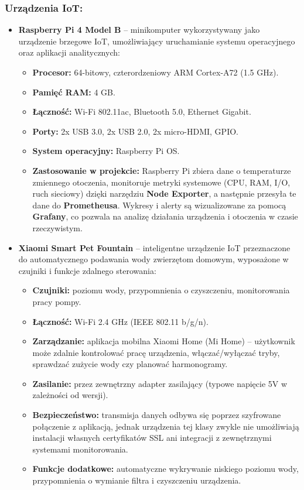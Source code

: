 \subsubsection{Urządzenia IoT:}
\begin{itemize}
\item \textbf{Raspberry Pi 4 Model B} – minikomputer wykorzystywany jako urządzenie brzegowe IoT, umożliwiający uruchamianie systemu operacyjnego oraz aplikacji analitycznych:
\begin{itemize}
\item \textbf{Procesor:} 64-bitowy, czterordzeniowy ARM Cortex-A72 (1.5 GHz).
\item \textbf{Pamięć RAM:} 4 GB.
\item \textbf{Łączność:} Wi-Fi 802.11ac, Bluetooth 5.0, Ethernet Gigabit.
\item \textbf{Porty:} 2x USB 3.0, 2x USB 2.0, 2x micro-HDMI, GPIO.
\item \textbf{System operacyjny:} Raspberry Pi OS.
\item \textbf{Zastosowanie w projekcie:} Raspberry Pi zbiera dane o temperaturze zmiennego otoczenia, monitoruje metryki systemowe (CPU, RAM, I/O, ruch sieciowy) dzięki narzędziu \textbf{Node Exporter}, a następnie przesyła te dane do \textbf{Prometheusa}. Wykresy i alerty są wizualizowane za pomocą \textbf{Grafany}, co pozwala na analizę działania urządzenia i otoczenia w czasie rzeczywistym.
\end{itemize}
\item \textbf{Xiaomi Smart Pet Fountain} – inteligentne urządzenie IoT przeznaczone do automatycznego podawania wody zwierzętom domowym, wyposażone w czujniki i funkcje zdalnego sterowania:
\begin{itemize}
    \item \textbf{Czujniki:} poziomu wody, przypomnienia o czyszczeniu, monitorowania pracy pompy.
    \item \textbf{Łączność:} Wi-Fi 2.4 GHz (IEEE 802.11 b/g/n).
    \item \textbf{Zarządzanie:} aplikacja mobilna Xiaomi Home (Mi Home) – użytkownik może zdalnie kontrolować pracę urządzenia, włączać/wyłączać tryby, sprawdzać zużycie wody czy planować harmonogramy.
    \item \textbf{Zasilanie:} przez zewnętrzny adapter zasilający (typowe napięcie 5V w zależności od wersji).
    \item \textbf{Bezpieczeństwo:} transmisja danych odbywa się poprzez szyfrowane połączenie z aplikacją, jednak urządzenia tej klasy zwykle nie umożliwiają instalacji własnych certyfikatów SSL ani integracji z zewnętrznymi systemami monitorowania.
    \item \textbf{Funkcje dodatkowe:} automatyczne wykrywanie niskiego poziomu wody, przypomnienia o wymianie filtra i czyszczeniu urządzenia.
\end{itemize}
\end{itemize}
